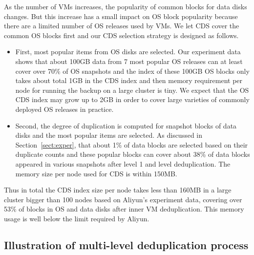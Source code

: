 As the number of VMs increases, the popularity of common blocks for data disks changes.
But this increase has a small impact on OS block popularity because 
there are a limited number of OS releases used by VMs. We let CDS cover the common OS blocks first and
our CDS selection strategy is designed as follows.
\begin{itemize}
\item First, most popular items from OS disks are selected.
Our experiment data shows that about 
100GB data from 7 most popular OS releases
can at least cover over 70\% of OS snapshots and the index of these 100GB OS blocks
only takes about total 1GB in the CDS index and then memory requirement per node for running the backup
on  a large cluster is tiny.
We expect that the OS CDS index may grow up to 2GB in order to cover large varieties  of commonly deployed
OS releases in practice.
\item Second, the degree of duplication is computed for snapshot blocks of data disks and
the  most popular items are selected. As discussed in Section~\ref{sect:exper}, 
that about 1\% of data blocks are selected based on their duplicate counts and these popular blocks
can cover about 38\% of data  blocks appeared in various snapshots after level 1 and level deduplication.  
The memory size per node used for CDS is within 150MB.
\end{itemize}
Thus in total the CDS index size per node takes less than 160MB in a large cluster bigger than 100 nodes based on
Aliyun's experiment data, covering over 53\% of blocks in OS and data disks after inner VM deduplication.
This memory usage is well below the limit required by Aliyun.


\subsection{Illustration  of multi-level deduplication process}


